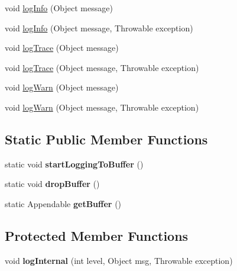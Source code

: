 \begin{DoxyCompactItemize}
\item 
void \mbox{\hyperlink{classcom_1_1mysql_1_1cj_1_1log_1_1_standard_logger_aeeb1226e65e7183722939e8ae666a910}{log\+Info}} (Object message)
\item 
void \mbox{\hyperlink{classcom_1_1mysql_1_1cj_1_1log_1_1_standard_logger_a9086549846486165e052a7e1ce190864}{log\+Info}} (Object message, Throwable exception)
\item 
void \mbox{\hyperlink{classcom_1_1mysql_1_1cj_1_1log_1_1_standard_logger_a31c4a397719a30877e689fcba2e1054a}{log\+Trace}} (Object message)
\item 
void \mbox{\hyperlink{classcom_1_1mysql_1_1cj_1_1log_1_1_standard_logger_ae77a38e81b2d0ecb1ccbeafee9294bd3}{log\+Trace}} (Object message, Throwable exception)
\item 
void \mbox{\hyperlink{classcom_1_1mysql_1_1cj_1_1log_1_1_standard_logger_a5197952ca4b6dfe59a54c1aa095717f7}{log\+Warn}} (Object message)
\item 
void \mbox{\hyperlink{classcom_1_1mysql_1_1cj_1_1log_1_1_standard_logger_a3e05a95a97a95afb400144f652f43c78}{log\+Warn}} (Object message, Throwable exception)
\end{DoxyCompactItemize}
\subsection*{Static Public Member Functions}
\begin{DoxyCompactItemize}
\item 
\mbox{\label{classcom_1_1mysql_1_1cj_1_1log_1_1_standard_logger_a831ea7f31d1a979788a0018a1926bc7f}} 
static void {\bfseries start\+Logging\+To\+Buffer} ()
\item 
\mbox{\label{classcom_1_1mysql_1_1cj_1_1log_1_1_standard_logger_a1f123fa8069f24fb6a6dadc637ed72d2}} 
static void {\bfseries drop\+Buffer} ()
\item 
\mbox{\label{classcom_1_1mysql_1_1cj_1_1log_1_1_standard_logger_a00cead61d34309cd88c4bbc4263e6ced}} 
static Appendable {\bfseries get\+Buffer} ()
\end{DoxyCompactItemize}
\subsection*{Protected Member Functions}
\begin{DoxyCompactItemize}
\item 
\mbox{\label{classcom_1_1mysql_1_1cj_1_1log_1_1_standard_logger_afcee91b3229c2c03530120c1a7842342}} 
void {\bfseries log\+Internal} (int level, Object msg, Throwable exception)
\end{DoxyCompactItemize}
